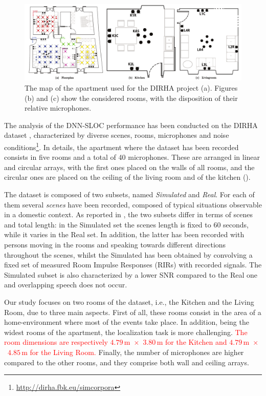 \begin{figure}[h]
	\centering
	\includegraphics[width=\textwidth]{img/plan}
	\caption{The map of the apartment used for the DIRHA project (a). Figures (b) and (c) show the considered rooms, with the disposition of their relative microphones. }
	\label{fig:DIRHA_map}
\end{figure}

The analysis of the DNN-SLOC performance has been conducted on the DIRHA dataset \cite{cristoforetti2014dirha}, characterized by diverse scenes, rooms, microphones and noise conditions\footnote{\url{http://dirha.fbk.eu/simcorpora}}. In details, the apartment where the dataset has been recorded consists in five rooms and a total of 40 microphones. These are arranged in linear and circular arrays, with the first ones placed on the walls of all rooms, and the circular ones are placed on the ceiling of the living room and of the kitchen ().

The dataset is composed of two subsets, named \emph{Simulated} and \emph{Real}. For each of them several \textit{scenes} have been recorded, composed of typical situations observable in a domestic context. As reported in , the two subsets differ in terms of scenes and total length: in the Simulated set the scenes length is fixed to 60 seconds, while it varies in the Real set. In addition, the latter has been recorded with persons moving in the rooms and speaking towards different directions throughout the scenes, whilst the Simulated has been obtained by convolving a fixed set of measured Room Impulse Responses (RIRs) with recorded signals.
The Simulated subset is also characterized by a lower SNR compared to the Real one and overlapping speech does not occur.

Our study focuses on two rooms of the dataset, i.e.,  the Kitchen and the Living Room, due to three main aspects. First of all, these rooms consist in the area of a home-environment where most of the events take place. In addition, being the widest rooms of the apartment, the localization task is more challenging. \textcolor{red}{The room dimensions are respectively $4.79$\,m~$\times$~$3.80$\,m for the Kitchen and $4.79$\,m~$\times$~$4.85$\,m for the Living Room.}
Finally, the number of microphones are higher compared to the other rooms, and they comprise both wall and ceiling arrays.

